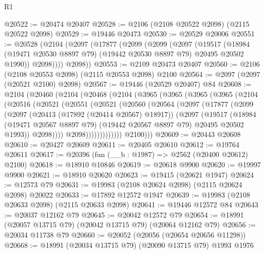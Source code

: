 \begin{lexlean}{R1}
\begin{coremodule}
@20522 := @20474 @20407
@20528 := @2106 (@2108 @20522 @2098) (@2115 @20522 @2098)
@20529 := @19446 @20473
@20530 := @20529 @20006
@20551 := @20528
    (@2104
      (@2097
        (@17877
          (@2099
            (@2099
              (@2097
                (@19517
                  (@18984 (@19471 @20530 @8897 @79) (@19442 @20530 @8897 @79) @20495 @20502 @1990))
                @2098))))
        @2098))
@20553 := @2109 @20473 @20407
@20560 := @2106 (@2108 @20553 @2098) (@2115 @20553 @2098) @2100
@20564 := @2097 (@2097 (@20521 @2100) @2098)
@20567 := @19446 (@20529 @20407) @84
@20608 := @2104
    (@20460
      (@2104
        (@20468
          (@2104
            (@3965
              (@3965
                (@3965
                  (@3965
                    (@2104
                      (@20516
                        (@20521
                          (@20551
                            (@20521
                              (@20560
                                (@20564
                                  (@2097
                                    (@17877
                                      (@2099
                                        (@2097
                                          (@20413 (@17892 (@20414 @20567) @18917))
                                          (@2097
                                            (@19517
                                              (@18984
                                                (@19471 @20567 @8897 @79)
                                                (@19442 @20567 @8897 @79)
                                                @20495
                                                @20502
                                                @1993))
                                            @2098))))
                                    @2098)))))))))))))
          @2100)))
@20609 := @20443 @20608
@20610 := @20427 @20609
@20611 := @20405 @20610
@20612 := @19764 @20611
@20617 := @20396 (fun (__b : @1987) => @2562 (@20400 @20612) @2100)
@20618 := @18910 @10846
@20619 := @20618 @9900
@20620 := @19997 @9900
@20621 := @18910 @20620
@20623 := @19415 (@20621 @1947)
@20624 := @12573 @79
@20631 := @19983 (@2108 @20624 @2098) (@2115 @20624 @2098) @20022
@20633 := @17892 @12572 @1947
@20639 := @19983 (@2108 @20633 @2098) (@2115 @20633 @2098)
@20641 := @19446 @12572 @84
@20643 := @20037 @12162 @79
@20645 := @20042 @12572 @79
@20654 := @18991 (@20057 @13715 @79) (@20042 @13715 @79) (@20064 @12162 @79)
@20656 := @20034 @11738 @79
@20660 := @20052 (@20056 (@20654 @20656 @11298))
@20668 := @18991 (@20034 @13715 @79) (@20090 @13715 @79) @1993 @1976

\end{coremodule}
\end{lexlean}
